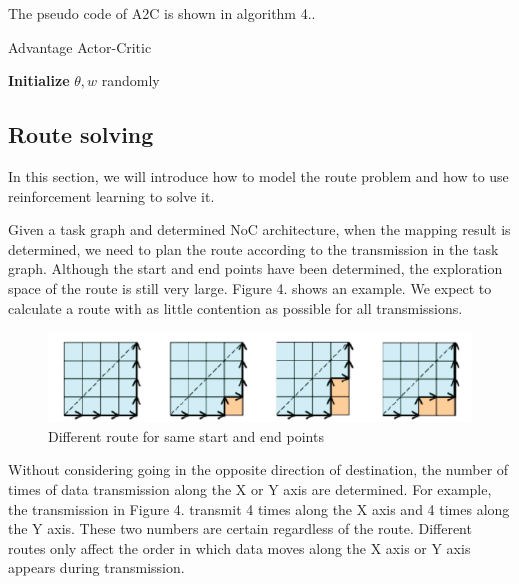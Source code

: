 The pseudo code of A2C is shown in algorithm 4..

\begin{algorithm}
    \caption{Advantage Actor-Critic}
    \LinesNumbered
    \textbf{Initialize}{
        $\theta, w$ randomly
    } \\
\end{algorithm}

\subsection{Route solving}
In this section, we will introduce how to model the route problem and how to use reinforcement learning to solve it. 

Given a task graph and determined NoC architecture, when the mapping result is determined, we need to plan the route according to the transmission in the task graph. Although the start and end points have been determined, the exploration space of the route is still very large. Figure 4. shows an example. We expect to calculate a route with as little contention as possible for all transmissions.

\begin{figure}
    \centering
    \includegraphics[width=\linewidth]{../Figures/example_for_route_space.png}
    \caption{Different route for same start and end points}
\end{figure}

Without considering going in the opposite direction of destination, the number of times of data transmission along the X or Y axis are determined. For example, the transmission in Figure 4. transmit 4 times along the X axis and 4 times along the Y axis. These two numbers are certain regardless of the route. Different routes only affect the order in which data moves along the X axis or Y axis appears during transmission. 

